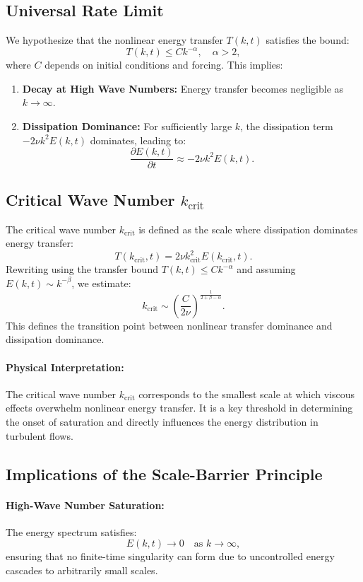 \documentclass[12pt]{article}
\theoremstyle{definition}
\begin{document}
\subsection{Universal Rate Limit}
We hypothesize that the nonlinear energy transfer $T(k, t)$ satisfies the bound:
\[
T(k, t) \leq C k^{-\alpha}, \quad \alpha > 2,
\]
where $C$ depends on initial conditions and forcing. This implies:
\begin{enumerate}
    \item \textbf{Decay at High Wave Numbers:} Energy transfer becomes negligible as $k \to \infty$.
    \item \textbf{Dissipation Dominance:} For sufficiently large $k$, the dissipation term $-2\nu k^2 E(k, t)$ dominates, leading to:
    \[
    \frac{\partial E(k, t)}{\partial t} \approx -2\nu k^2 E(k, t).
    \]
\end{enumerate}

\subsection{Critical Wave Number $k_{\text{crit}}$}
The critical wave number $k_{\text{crit}}$ is defined as the scale where dissipation dominates energy transfer:
\[
T(k_{\text{crit}}, t) = 2\nu k_{\text{crit}}^2 E(k_{\text{crit}}, t).
\]
Rewriting using the transfer bound $T(k, t) \leq C k^{-\alpha}$ and assuming $E(k, t) \sim k^{-\beta}$, we estimate:
\[
k_{\text{crit}} \sim \left(\frac{C}{2\nu}\right)^{\frac{1}{2+\beta-\alpha}}.
\]
This defines the transition point between nonlinear transfer dominance and dissipation dominance.

\paragraph{Physical Interpretation:} The critical wave number $k_{\text{crit}}$ corresponds to the smallest scale at which viscous effects overwhelm nonlinear energy transfer. It is a key threshold in determining the onset of saturation and directly influences the energy distribution in turbulent flows.

\subsection{Implications of the Scale-Barrier Principle}

\paragraph{High-Wave Number Saturation:}
The energy spectrum satisfies:
\[
E(k, t) \to 0 \quad \text{as } k \to \infty,
\]
ensuring that no finite-time singularity can form due to uncontrolled energy cascades to arbitrarily small scales.
\end{document}
